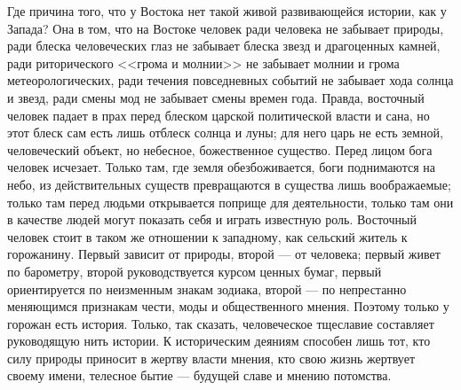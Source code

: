 \documentclass[12pt]{article}
\begin{document}
Где причина того, что у Востока нет такой живой развивающейся истории, как у Запада? Она в том, что на Востоке человек ради человека не забывает природы, ради блеска человеческих глаз не забывает блеска звезд и драгоценных камней, ради риторического <<грома и молнии>> не забывает молнии и грома метеорологических, ради течения повседневных событий не забывает хода солнца и звезд, ради смены мод не забывает смены времен года. Правда, восточный человек падает в прах перед блеском царской политической власти и сана, но этот блеск сам есть лишь отблеск солнца и луны; для него царь не есть земной, человеческий объект, но небесное, божественное существо. Перед лицом бога человек исчезает. Только там, где земля обезбоживается, боги поднимаются на небо, из действительных существ превращаются в существа лишь воображаемые; только там перед людьми открывается поприще для деятельности, только там они в качестве людей могут показать себя и играть известную роль. Восточный человек стоит в таком же отношении к западному, как сельский житель к горожанину. Первый зависит от природы, второй --- от человека; первый живет по барометру, второй руководствуется курсом ценных бумаг, первый ориентируется по неизменным знакам зодиака, второй --- по непрестанно меняющимся признакам чести, моды и общественного мнения. Поэтому только у горожан есть история. Только, так сказать, человеческое тщеславие составляет руководящую нить истории. К историческим деяниям способен лишь тот, кто силу природы приносит в жертву власти мнения, кто свою жизнь жертвует своему имени, телесное бытие --- будущей славе и мнению потомства.


\section{}
\end{document}
